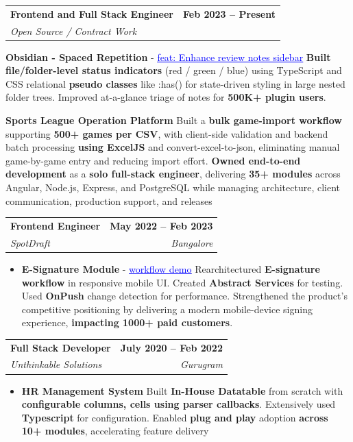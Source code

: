 \documentclass[letterpaper,10pt]{article}
\makeatletter
\newcommand{\resumeItem}[1]{
  \item\small{
    {#1 \vspace{-2pt}}
  }
}
\newcommand{\resumeSubheading}[4]{
  \vspace{-2pt}\item
    \begin{tabular*}{1.0\textwidth}[t]{l@{\extracolsep{\fill}}r}
      \textbf{#1} & \textbf{\small #2} \\
      \textit{\small#3} & \textit{\small #4} \\
    \end{tabular*}\vspace{-7pt}
}
\newcommand{\resumeItemListStart}{\begin{itemize}}
\newcommand{\resumeItemListEnd}{\end{itemize}\vspace{-5pt}}
\makeatother
\begin{document}
\resumeSubheading{Frontend and Full Stack Engineer}{Feb 2023 -- Present}{Open Source / Contract Work}{}
\resumeItemListStart
\resumeItem{
\textbf{Obsidian - Spaced Repetition} - \href{https://github.com/st3v3nmw/obsidian-spaced-repetition/pull/1585}{\textcolor{blue}{\underline{feat: Enhance review notes sidebar}}}
\newline
\textbf{Built file/folder-level status indicators} (red / green / blue) using TypeScript and CSS relational \textbf{pseudo classes} like :has() for state-driven styling in large nested folder trees. Improved at-a-glance triage of notes for \textbf{500K+ plugin users}.
\resumeItem{


\textbf{Sports League Operation Platform}
\newline
Built a \textbf{bulk game-import workflow} supporting \textbf{500+ games per CSV}, with client-side validation and backend batch processing \textbf{using ExcelJS} and convert-excel-to-json, eliminating manual game-by-game entry and reducing import effort.
\newline
\textbf{Owned end-to-end development} as a \textbf{solo full-stack engineer}, delivering \textbf{35+ modules} across Angular, Node.js, Express, and PostgreSQL while managing architecture, client communication, production support, and releases

}}

\resumeItemListEnd



\resumeSubheading{Frontend Engineer}{May 2022 -- Feb 2023}{SpotDraft}{Bangalore}
\resumeItemListStart
\resumeItem{
\textbf{E-Signature Module} - \href{https://drive.google.com/file/d/1mk2LK5-s5LVKd_3G_H5tf5gIsxwKz5Bf/view}{\textcolor{blue}{\underline{workflow demo}}}
\newline
Rearchitectured \textbf{E-signature workflow} in responsive mobile UI. Created \textbf{Abstract Services} for testing. Used \textbf{OnPush} change detection for performance. Strengthened the product’s competitive positioning by delivering a modern mobile-device signing experience, \textbf{impacting 1000+ paid customers}.



}
\resumeItemListEnd

\resumeSubheading{Full Stack Developer}{July 2020 -- Feb 2022}{Unthinkable Solutions}{Gurugram}
\resumeItemListStart

\resumeItem{
\textbf{HR Management System}
\newline
Built \textbf{In-House Datatable} from scratch with \textbf{configurable columns, cells using parser callbacks}. Extensively used \textbf{Typescript} for configuration. Enabled \textbf{plug and play} adoption \textbf{across 10+ modules}, accelerating feature delivery
}
\resumeItemListEnd
\end{document}

